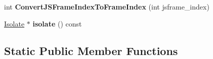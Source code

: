 \begin{DoxyCompactItemize}
\item 
\hypertarget{classv8_1_1internal_1_1_deoptimizer_a1223f29e38a82108ea65481efce7b517}{}int {\bfseries Convert\+J\+S\+Frame\+Index\+To\+Frame\+Index} (int jsframe\+\_\+index)\label{classv8_1_1internal_1_1_deoptimizer_a1223f29e38a82108ea65481efce7b517}

\item 
\hypertarget{classv8_1_1internal_1_1_deoptimizer_a071c35abe4dcc0c67202a0c2f3908993}{}\hyperlink{classv8_1_1internal_1_1_isolate}{Isolate} $\ast$ {\bfseries isolate} () const \label{classv8_1_1internal_1_1_deoptimizer_a071c35abe4dcc0c67202a0c2f3908993}

\end{DoxyCompactItemize}
\subsection*{Static Public Member Functions}
